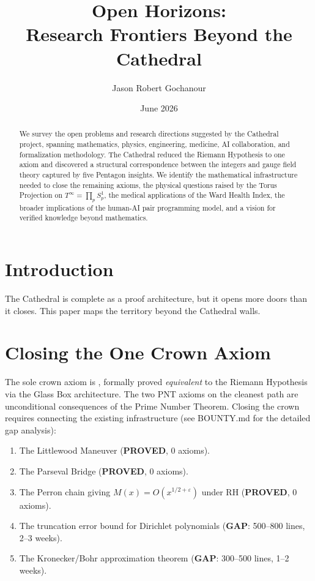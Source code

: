 \documentclass[11pt,a4paper]{article}
\title{%
  Open Horizons:\\
  Research Frontiers Beyond the Cathedral%
}
\author{Jason Robert Gochanour}
\date{June 2026}
\begin{document}
\maketitle

\begin{abstract}
We survey the open problems and research directions suggested by
the Cathedral project, spanning mathematics, physics, engineering,
medicine, AI collaboration, and formalization methodology.
The Cathedral reduced the Riemann Hypothesis to one axiom
and discovered a structural correspondence between the integers
and gauge field theory captured by five Pentagon insights.
We identify the mathematical infrastructure needed to close the
remaining axioms, the physical questions raised by the Torus
Projection on $T^\infty = \prod_p S^1_p$, the medical applications
of the Ward Health Index, the broader implications of the
human-AI pair programming model, and a vision for verified
knowledge beyond mathematics.
\end{abstract}

\tableofcontents

\section{Introduction}

The Cathedral is complete as a proof architecture, but it opens
more doors than it closes. This paper maps the territory beyond
the Cathedral walls.

\section{Closing the One Crown Axiom}

The sole crown axiom is , formally
proved \emph{equivalent} to the Riemann Hypothesis via the Glass Box
architecture. The two PNT axioms on the cleanest path are
unconditional consequences of the Prime Number Theorem.
Closing the crown requires connecting the existing infrastructure
(see BOUNTY.md for the detailed gap analysis):

\begin{enumerate}
  \item The Littlewood Maneuver (\textbf{PROVED}, 0 axioms).
  \item The Parseval Bridge (\textbf{PROVED}, 0 axioms).
  \item The Perron chain giving $M(x) = O(x^{1/2+\varepsilon})$
    under RH (\textbf{PROVED}, 0 axioms).
  \item The truncation error bound for Dirichlet polynomials
    (\textbf{GAP}: 500--800 lines, 2--3 weeks).
  \item The Kronecker/Bohr approximation theorem
    (\textbf{GAP}: 300--500 lines, 1--2 weeks).
\end{enumerate}
\end{document}
